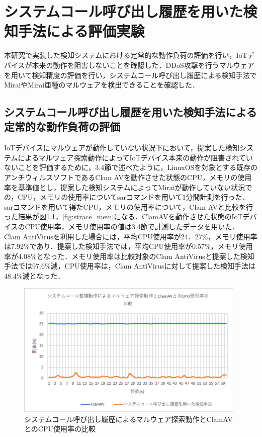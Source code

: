 \chapter{システムコール呼び出し履歴を用いた検知手法による評価実験}
本研究で実装した検知システムにおける定常的な動作負荷の評価を行い，IoTデバイスが本来の動作を阻害しないことを確認した．DDoS攻撃を行うマルウェアを用いて検知精度の評価を行い，システムコール呼び出し履歴による検知手法でMiraiやMirai亜種のマルウェアを検出できることを確認した．

\section{システムコール呼び出し履歴を用いた検知手法による定常的な動作負荷の評価}

IoTデバイスにマルウェアが動作していない状況下において，提案した検知システムによるマルウェア探索動作によってIoTデバイス本来の動作が阻害されていないことを評価するために，3.4節で述べたように，LinuxOSを対象とする既存のアンチウィルスソフトであるClam AVを動作させた状態のCPU，メモリの使用率を基準値とし，提案した検知システムによってMiraiが動作していない状況での，CPU，メモリの使用率についてsarコマンドを用いて1分間計測を行った．
sarコマンドを用いて得たCPU，メモリの使用率について，Clam AVと比較を行った結果が図\ref{fig:strace_cpu}，\ref{fig:strace_mem}になる．ClamAVを動作させた状態のIoTデバイスのCPU使用率，メモリ使用率の値は3.4節で計測したデータを用いた．
Clam AntiVirusを利用した場合には，平均CPU使用率が24．27\%，メモリ使用率は7.92\%であり．提案した検知手法では，平均CPU使用率が0.57\%，メモリ使用率が4.08\%となった．メモリ使用率は比較対象のClam AntiVirusと提案した検知手法では97.6\%減，CPU使用率は，Clam AntiVirusに対して提案した検知手法は48.4\%減となった．


\clearpage
\begin{figure}[h]
    \centering
       \includegraphics[width=110mm]{figures/strace_cpu.eps}
    \caption{システムコール呼び出し履歴によるマルウェア探索動作とClamAVとのCPU使用率の比較}
        \label{fig:strace_cpu}
\end{figure}
  
